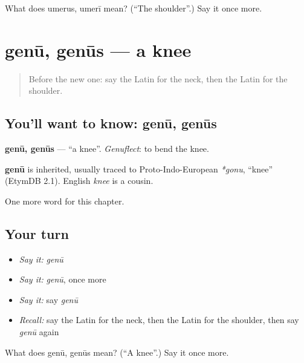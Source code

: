 \begin{tcolorbox}[breakable,colback=teal!4,colframe=teal!35!black,title={Before you move on}]
What does umerus, umerī mean? (\textquotedblleft{}The shoulder\textquotedblright{}.) Say it once more.
\end{tcolorbox}
\section[genū, genūs]{genū, genūs — a knee}

\label{lesson:LA-C64-genu}



\begin{quote}
Before the new one: say the Latin for the neck, then the Latin for the shoulder.
\end{quote}

\subsection*{You'll want to know: genū, genūs}
\textbf{genū, genūs} — \textquotedblleft{}a knee\textquotedblright{}. \emph{Genuflect}: to bend the knee.

\begin{cousinweb}
\textbf{genū} is inherited, usually traced to Proto-Indo-European \emph{*gonu}, \textquotedblleft{}knee\textquotedblright{} (EtymDB 2.1). English \emph{knee} is a cousin.
\end{cousinweb}

\begin{grammarlens}[title={What you've built}]
One more word for this chapter.
\end{grammarlens}

\subsection*{Your turn}
\begin{itemize}
\raggedright
  \item \emph{Say it:} \emph{genū}
  \item \emph{Say it:} \emph{genū}, once more
  \item \emph{Say it:} say \emph{genū}
  \item \emph{Recall:} say the Latin for the neck, then the Latin for the shoulder, then say \emph{genū} again
\end{itemize}

\begin{tcolorbox}[breakable,colback=teal!4,colframe=teal!35!black,title={Before you move on}]
What does genū, genūs mean? (\textquotedblleft{}A knee\textquotedblright{}.) Say it once more.
\end{tcolorbox}
